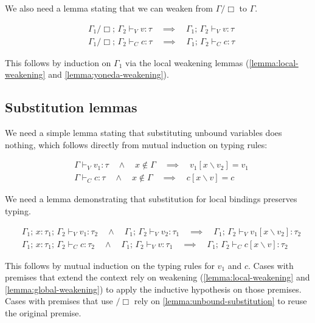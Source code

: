 \documentclass[acmsmall, screen, review, anonymous]{acmart}
\theoremstyle{definition}
\newcommand{\types}{\mathrel{:}}
\newcommand{\ccons}[2]{#1;\,#2}
\newcommand{\lbind}[3]{\ccons{#1}{#2\types#3}}
\newcommand{\cdiv}[1]{#1/\Box}
\newcommand{\sub}[2]{[#1\backslash#2]}
\newcommand{\sbst}[3]{#1\sub{#2}{#3}}
\newcommand{\turnv}{\mathrel{\vdash_V}}
\newcommand{\turnc}{\mathrel{\vdash_C}}
\begin{document}
We also need a lemma stating that we can weaken from $\cdiv{\Gamma}$ to
$\Gamma$.
\begin{lemma}
\label{lemma:cdiv-weakening}
  \begin{align*}
    &\ccons{\cdiv{\Gamma_1}}{\Gamma_2} \turnv v \types \tau
    \quad \implies \quad \ccons{\Gamma_1}{\Gamma_2} \turnv v \types \tau \\
    &\ccons{\cdiv{\Gamma_1}}{\Gamma_2} \turnc c \types \tau
    \quad \implies \quad \ccons{\Gamma_1}{\Gamma_2} \turnc c \types \tau
  \end{align*}
\end{lemma}
This follows by induction on $\Gamma_1$ via the local weakening lemmas
(\ref{lemma:local-weakening} and \ref{lemma:yoneda-weakening}).

\subsection{Substitution lemmas}

We need a simple lemma stating that substituting unbound variables does
nothing, which follows directly from mutual induction on typing rules:
\begin{lemma}
\label{lemma:unbound-substitution}
  \begin{align*}
    &\Gamma \turnv v_1 \types \tau
    \quad \wedge \quad x \notin \Gamma
    \quad \implies \quad \sbst{v_1}{x}{v_2} = v_1 \\
    &\Gamma \turnc c \types \tau
    \quad \wedge \quad x \notin \Gamma
    \quad \implies \quad \sbst{c}{x}{v} = c
  \end{align*}
\end{lemma}

We need a lemma demonstrating that substitution for local bindings
preserves typing.
\begin{lemma}
\label{lemma:local-substitution}
  \begin{align*}
    &\ccons{\lbind{\Gamma_1}{x}{\tau_1}}{\Gamma_2} \turnv v_1 \types \tau_2
    \quad \wedge \quad \ccons{\Gamma_1}{\Gamma_2} \turnv v_2 \types \tau_1
    \quad \implies \quad \ccons{\Gamma_1}{\Gamma_2} \turnv \sbst{v_1}{x}{v_2} \types \tau_2 \\
    &\ccons{\lbind{\Gamma_1}{x}{\tau_1}}{\Gamma_2} \turnc c \types \tau_2
    \quad \wedge \quad \ccons{\Gamma_1}{\Gamma_2} \turnv v \types \tau_1
    \quad \implies \quad \ccons{\Gamma_1}{\Gamma_2} \turnc \sbst{c}{x}{v} \types \tau_2
  \end{align*}
\end{lemma}
This follows by mutual induction on the typing rules for $v_1$ and
$c$. Cases with premises that extend the context rely on weakening
(\ref{lemma:local-weakening} and \ref{lemma:global-weakening}) to apply
the inductive hypothesis on those premises. Cases with premises that use
$\cdiv{}$ rely on \ref{lemma:unbound-substitution} to reuse the original
premise.
\end{document}
